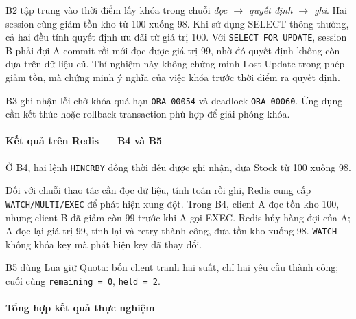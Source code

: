 B2 tập trung vào thời điểm lấy khóa trong chuỗi \emph{đọc \(\rightarrow\) quyết định \(\rightarrow\) ghi}. Hai session cùng giảm tồn kho từ 100 xuống 98. Khi sử dụng SELECT thông thường, cả hai đều tính quyết định ưu đãi từ giá trị 100. Với \texttt{SELECT FOR UPDATE}, session B phải đợi A commit rồi mới đọc được giá trị 99, nhờ đó quyết định không còn dựa trên dữ liệu cũ. Thí nghiệm này không chứng minh Lost Update trong phép giảm tồn, mà chứng minh ý nghĩa của việc khóa trước thời điểm ra quyết định.

B3 ghi nhận lỗi chờ khóa quá hạn \texttt{ORA-\allowbreak{}00054} và deadlock \texttt{ORA-\allowbreak{}00060}. Ứng dụng cần kết thúc hoặc rollback transaction phù hợp để giải phóng khóa.

\paragraph*{Kết quả trên Redis — B4 và B5}

Ở B4, hai lệnh \texttt{HINCRBY} đồng thời đều được ghi nhận, đưa Stock từ 100 xuống 98.

Đối với chuỗi thao tác cần đọc dữ liệu, tính toán rồi ghi, Redis cung cấp \texttt{WATCH/\allowbreak{}MULTI/\allowbreak{}EXEC} để phát hiện xung đột. Trong B4, client A đọc tồn kho 100, nhưng client B đã giảm còn 99 trước khi A gọi EXEC. Redis hủy hàng đợi của A; A đọc lại giá trị 99, tính lại và retry thành công, đưa tồn kho xuống 98. \texttt{WATCH} không khóa key mà phát hiện key đã thay đổi.

B5 dùng Lua giữ Quota: bốn client tranh hai suất, chỉ hai yêu cầu thành công; cuối cùng \texttt{remaining =\allowbreak{} 0}, \texttt{held =\allowbreak{} 2}.

\paragraph*{Tổng hợp kết quả thực nghiệm}

